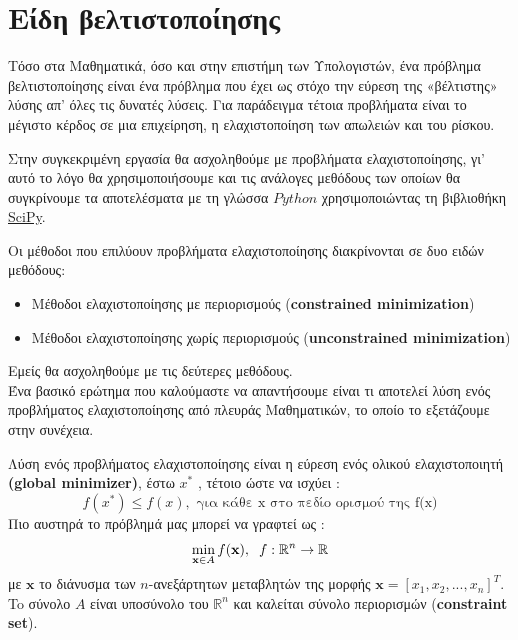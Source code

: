 \documentclass[a4paper,12pt,twoside]{report}
\theoremstyle{plain}
\theoremstyle{definition}
\theoremstyle{remark}
\begin{document}
	\section{Είδη βελτιστοποίησης}
    Τόσο στα Μαθηματικά, όσο και στην επιστήμη των Υπολογιστών, ένα πρόβλημα βελτιστοποίησης είναι ένα πρόβλημα που έχει ως στόχο την εύρεση της «βέλτιστης» λύσης απ' όλες τις δυνατές λύσεις. Για παράδειγμα τέτοια προβλήματα είναι το μέγιστο κέρδος σε μια επιχείρηση, η ελαχιστοποίηση των απωλειών και του ρίσκου.
    
    Στην συγκεκριμένη εργασία θα ασχοληθούμε με προβλήματα ελαχιστοποίησης, γι' αυτό το λόγο θα χρησιμοποιήσουμε και τις ανάλογες μεθόδους των οποίων θα συγκρίνουμε τα αποτελέσματα με τη γλώσσα $Python$ χρησιμοποιώντας τη βιβλιοθήκη \href{https://docs.scipy.org/doc/scipy/reference/index.html}{SciPy}.
    
    Οι μέθοδοι που επιλύουν προβλήματα ελαχιστοποίησης διακρίνονται σε δυο ειδών μεθόδους:
    \begin{itemize}
    \item Μέθοδοι ελαχιστοποίησης με περιορισμούς (\textbf{constrained minimization})
    \vspace{-0.2cm}
    \item Μέθοδοι ελαχιστοποίησης χωρίς περιορισμούς (\textbf{unconstrained minimization})
    \end{itemize}
    \vspace{-0.2cm}
	Εμείς θα ασχοληθούμε με τις δεύτερες μεθόδους. \\
    
    Ένα βασικό ερώτημα που καλούμαστε να απαντήσουμε είναι τι αποτελεί λύση ενός προβλήματος ελαχιστοποίησης από πλευράς Μαθηματικών, το οποίο το εξετάζουμε στην συνέχεια.
    
    Λύση ενός προβλήματος ελαχιστοποίησης είναι η εύρεση ενός ολικού ελαχιστοποιητή \textbf{(global minimizer)}, έστω $x^*$ , τέτοιο ώστε να ισχύει :
    \begin{equation}
    	f (x^*) \leq f(x), \text{ για κάθε x  στο πεδίο ορισμού της f(x)}
	\end{equation}
Πιο αυστηρά το πρόβλημά μας μπορεί να γραφτεί ως :
	\begin{equation}
	    \min_{\textbf{x} \in A} f(\textbf{x}), 		\hspace{0.2cm}f:\mathbb{R}^{n}\rightarrow \mathbb{R}
	\end{equation}    
με $\textbf{x}$ το διάνυσμα των $n$-ανεξάρτητων μεταβλητών της μορφής $\textbf{x}=[x_1,x_2,...,x_n]^T$. To σύνολο $A$ είναι υποσύνολο του $\mathbb{R}^n$ και καλείται σύνολο περιορισμών (\textbf{constraint set}).
\end{document}
